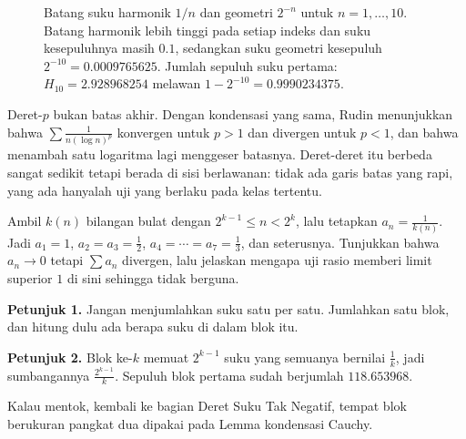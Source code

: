 \begin{figure}[htbp]
\centering
{}
\caption{Batang suku harmonik $1/n$ dan geometri $2^{-n}$ untuk $n=1,\ldots,10$.
Batang harmonik lebih tinggi pada setiap indeks dan suku kesepuluhnya masih $0.1$,
sedangkan suku geometri kesepuluh $2^{-10} = 0.0009765625$. Jumlah sepuluh suku
pertama: $H_{10} = 2.928968254$ melawan $1 - 2^{-10} = 0.9990234375$.}
\label{fig:batang-suku}
\end{figure}


Deret-$p$ bukan batas akhir. Dengan kondensasi yang sama, Rudin menunjukkan bahwa
$\sum \frac{1}{n(\log n)^p}$ konvergen untuk $p>1$ dan divergen untuk $p<1$, dan bahwa
menambah satu logaritma lagi menggeser batasnya. Deret-deret itu berbeda sangat sedikit
tetapi berada di sisi berlawanan: tidak ada garis batas yang rapi, yang ada hanyalah uji
yang berlaku pada kelas tertentu.

\begin{tantangan}
Ambil $k(n)$ bilangan bulat dengan $2^{k-1} \le n < 2^k$, lalu tetapkan
$a_n = \frac{1}{k(n)}$. Jadi $a_1 = 1$, $a_2 = a_3 = \tfrac12$,
$a_4 = \cdots = a_7 = \tfrac13$, dan seterusnya. Tunjukkan bahwa $a_n \to 0$ tetapi
$\sum a_n$ divergen, lalu jelaskan mengapa uji rasio memberi limit superior $1$ di
sini sehingga tidak berguna.

\textbf{Petunjuk 1.} Jangan menjumlahkan suku satu per satu. Jumlahkan satu blok, dan
hitung dulu ada berapa suku di dalam blok itu.

\textbf{Petunjuk 2.} Blok ke-$k$ memuat $2^{k-1}$ suku yang semuanya bernilai
$\frac{1}{k}$, jadi sumbangannya $\frac{2^{k-1}}{k}$. Sepuluh blok pertama sudah
berjumlah $118.653968$.

Kalau mentok, kembali ke bagian Deret Suku Tak Negatif, tempat blok berukuran pangkat
dua dipakai pada Lemma kondensasi Cauchy.
\end{tantangan}

